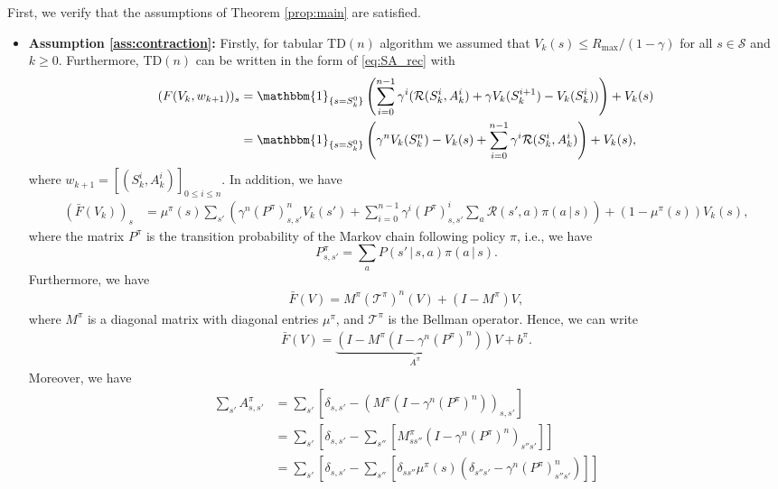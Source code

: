 \documentclass[letterpaper, 10 pt]{article}
\begin{document}
First, we verify that the assumptions of Theorem \ref{prop:main} are satisfied.
\begin{itemize}
    \item \textbf{Assumption \ref{ass:contraction}:} Firstly, for tabular TD$(n)$ algorithm we assumed that $V_k(s)\leq R_{\max}/(1-\gamma)$ for all $s\in\mathcal{S}$ and $k\geq 0$. Furthermore, TD$(n)$ can be written in the form of \eqref{eq:SA_rec} with
    \begin{align}
     (F(V_k,w_{k+1}))_s &=\mathbbm{1}_{\{s=S_k^0\}}\left( \sum_{i=0}^{n-1} \gamma^{i}(\mathcal{R}(S_k^i, A_k^i)+\gamma V_k(S_k^{i+1}) - V_{k}(S_k^i))  \right)+ V_k(s)\nonumber\\
    &= \mathbbm{1}_{\{s=S_k^0\}}\left( \gamma^nV_{k}(S_k^n)-V_k(s) + \sum_{i=0}^{n-1} \gamma^{i}\mathcal{R}(S_k^i, A_k^i)  \right)+ V_k(s),\label{eq:F_def}
    \end{align}
    where $w_{k+1} = [(S_k^i,A_k^i)]_{0\leq i\leq n}$. In addition, we have
    \begin{align*}
        (\bar{F}(V_k))_s &= \mu^\pi(s)\sum_{s'}\left( \gamma^n(P^\pi)^n_{s,s'}V_{k}(s') + \sum_{i=0}^{n-1} \gamma^{i}(P^\pi)^i_{s,s'}\sum_{a}\mathcal{R}(s', a)\pi(a\,|\,s)  \right) + (1-\mu^\pi(s))V_k(s),
    \end{align*}
    where the matrix $P^\pi$ is the transition probability of the Markov chain following policy $\pi$, i.e., we have
    \[ P^\pi_{s,s'}=\sum_a P(s'\,|\,s,a)\pi(a\,|\,s). \]
   Furthermore, we have
    \begin{align*}
        \bar{F}(V) = M^\pi (\mathcal{T}^\pi)^n (V)+(I-M^\pi) V,
    \end{align*}
    where $M^\pi$ is a diagonal matrix with diagonal entries $\mu^\pi$, and $\mathcal{T}^\pi$ is the Bellman operator. Hence, we can write 
    \begin{align*}
        \bar{F}(V) = \underbrace{(I-M^\pi(I -\gamma^n(P^\pi)^n))}_{A^\pi}V +b^\pi.
    \end{align*}
    Moreover, we have 
    \begin{align}
        \sum_{s'} A_{s,s'}^\pi&=\sum_{s'} \left[\delta_{s,s'}-(M^\pi(I -\gamma^n(P^\pi)^n))_{s,s'}\right]\nonumber\\
        &=\sum_{s'} \left[\delta_{s,s'}-\sum_{s''}\left[M^\pi_{ss''}(I -\gamma^n (P^\pi)^n)_{s''s'}\right]\right]\nonumber\\
        &=\sum_{s'} \left[\delta_{s,s'}-\sum_{s''}\left[\delta_{ss''}\mu^\pi(s)(\delta_{s''s'} -\gamma^n (P^\pi)^n_{s''s'})\right]\right]\nonumber\\

\end{align}
\end{itemize}
\end{document}
